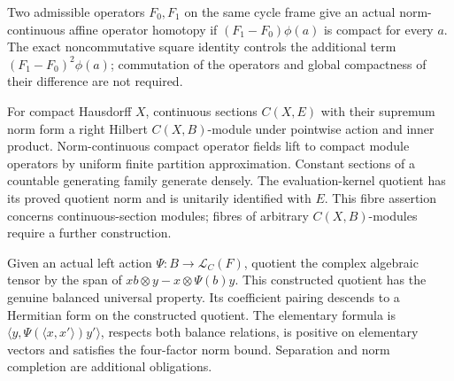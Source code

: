 \begin{proposition}\label{prop:compact-perturbation-operator-homotopy}
\leanok
Two admissible operators $F_0,F_1$ on the same cycle frame give an actual
norm-continuous affine operator homotopy if
$(F_1-F_0)\phi(a)$ is compact for every $a$. The exact noncommutative square
identity controls the additional term $(F_1-F_0)^2\phi(a)$; commutation of the
operators and global compactness of their difference are not required.
\end{proposition}

\begin{proposition}\label{prop:continuous-section-hilbert-module}
\leanok
For compact Hausdorff $X$, continuous sections $C(X,E)$ with their supremum
norm form a right Hilbert $C(X,B)$-module under pointwise action and inner
product. Norm-continuous compact operator fields lift to compact module
operators by uniform finite partition approximation. Constant sections of a
countable generating family generate densely. The evaluation-kernel quotient
has its proved quotient norm and is unitarily identified with $E$.
This fibre assertion concerns continuous-section modules; fibres of arbitrary
$C(X,B)$-modules require a further construction.
\end{proposition}

\begin{definition}\label{def:balanced-module-tensor-algebraic}
\leanok
Given an actual left action $\Psi:B\to\mathcal L_C(F)$, quotient the complex
algebraic tensor by the span of $xb\otimes y-x\otimes\Psi(b)y$.
This constructed quotient has the genuine balanced universal property.
Its coefficient pairing descends to a Hermitian form on the constructed quotient.
The elementary formula is
$\langle y,\Psi(\langle x,x'\rangle)y'\rangle$, respects both balance
relations, is positive on elementary vectors and satisfies the four-factor
norm bound. Separation and norm completion are additional obligations.
\end{definition}

